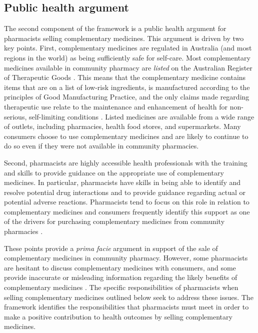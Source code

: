 \documentclass[12pt,]{article}
\begin{document}
\subsection{Public health argument}\label{public-health-argument}

The second component of the framework is a public health argument for
pharmacists selling complementary medicines. This argument is driven by
two key points. First, complementary medicines are regulated in
Australia (and most regions in the world) as being sufficiently safe for
self-care. Most complementary medicines available in community pharmacy
are \emph{listed} on the Australian Register of Therapeutic Goods
\autocite{TGA2019_listed}. This means that the complementary medicine
contains items that are on a list of low-risk ingredients, is
manufactured according to the principles of Good Manufacturing Practice,
and the only claims made regarding therapeutic use relate to the
maintenance and enhancement of health for non-serious, self-limiting
conditions \autocite{TGA2019_listed}. Listed medicines are available
from a wide range of outlets, including pharmacies, health food stores,
and supermarkets. Many consumers choose to use complementary medicines
and are likely to continue to do so even if they were not available in
community pharmacies.

Second, pharmacists are highly accessible health professionals with the
training and skills to provide guidance on the appropriate use of
complementary medicines. In particular, pharmacists have skills in being
able to identify and resolve potential drug interactions and to provide
guidance regarding actual or potential adverse reactions. Pharmacists
tend to focus on this role in relation to complementary medicines and
consumers frequently identify this support as one of the drivers for
purchasing complementary medicines from community pharmacies
\autocites{Olatunde2010}{Kanjanarach2011}.

These points provide a \emph{prima facie} argument in support of the
sale of complementary medicines in community pharmacy. However, some
pharmacists are hesitant to discuss complementary medicines with
consumers, and some provide inaccurate or misleading information
regarding the likely benefits of complementary medicines
\autocites{SalmanPopattia2018}{Arnold2016}{Bray2017}. The specific
responsibilities of pharmacists when selling complementary medicines
outlined below seek to address these issues. The framework identifies
the responsibilities that pharmacists must meet in order to make a
positive contribution to health outcomes by selling complementary
medicines.
\end{document}
